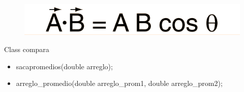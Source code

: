 \documentclass{beamer}
\begin{document}
\begin{frame}
\begin{columns}[c]
\end{columns}

\begin{figure}
\includegraphics[width=0.5\linewidth]{prod_punto.png}
\end{figure}


\end{frame}



\begin{frame}

Class compara
 
\begin{itemize}
\item sacapromedios(double arreglo);
\item arreglo\_promedio(double arreglo\_prom1, double arreglo\_prom2);

\end{itemize}

\end{frame}

\end{document}
